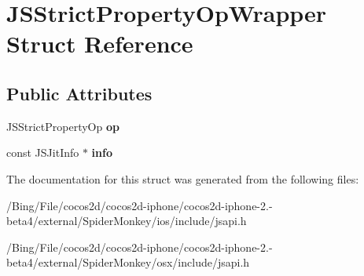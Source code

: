\hypertarget{struct_j_s_strict_property_op_wrapper}{\section{J\-S\-Strict\-Property\-Op\-Wrapper Struct Reference}
\label{struct_j_s_strict_property_op_wrapper}
}
\subsection*{Public Attributes}
\begin{DoxyCompactItemize}
\item 
\hypertarget{struct_j_s_strict_property_op_wrapper_ac2f0a220e37b7113728e97b177e9422e}{J\-S\-Strict\-Property\-Op {\bfseries op}}\label{struct_j_s_strict_property_op_wrapper_ac2f0a220e37b7113728e97b177e9422e}

\item 
\hypertarget{struct_j_s_strict_property_op_wrapper_a75f81afdafef29bd2f2147129550f7a7}{const J\-S\-Jit\-Info $\ast$ {\bfseries info}}\label{struct_j_s_strict_property_op_wrapper_a75f81afdafef29bd2f2147129550f7a7}

\end{DoxyCompactItemize}


The documentation for this struct was generated from the following files\-:\begin{DoxyCompactItemize}
\item 
/\-Bing/\-File/cocos2d/cocos2d-\/iphone/cocos2d-\/iphone-\/2.-\/beta4/external/\-Spider\-Monkey/ios/include/jsapi.\-h\item 
/\-Bing/\-File/cocos2d/cocos2d-\/iphone/cocos2d-\/iphone-\/2.-\/beta4/external/\-Spider\-Monkey/osx/include/jsapi.\-h\end{DoxyCompactItemize}
